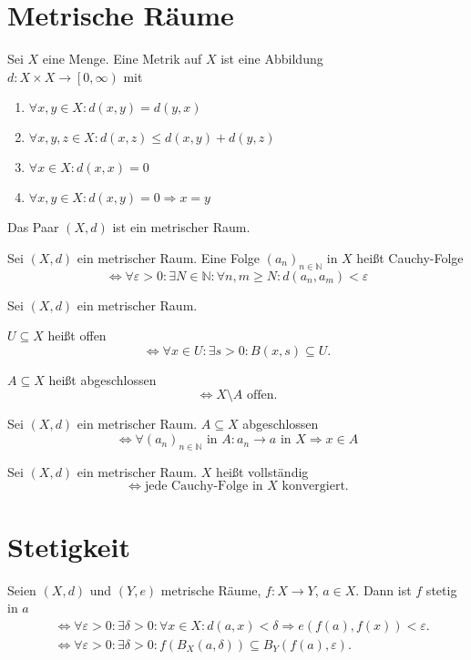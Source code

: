 \documentclass[]{scrartcl}
\newcommand{\N}{\ensuremath{\mathbb{N}}}
\begin{document}
\section*{Metrische R\"aume}
\begin{definition}
Sei $X$ eine Menge. Eine Metrik auf $X$ ist eine Abbildung\\$d\colon X\times X\to\left[0,\infty\right)$ mit
\begin{enumerate}
\item $\forall x,y\in X\colon d(x,y)=d(y,x)$
\item $\forall x,y,z\in X\colon d(x,z)\leq d(x,y)+d(y,z)$
\item $\forall x\in X\colon d(x,x)=0$
\item $\forall x,y\in X\colon d(x,y)=0\Rightarrow x=y$
\end{enumerate}
Das Paar $(X,d)$ ist ein metrischer Raum.
\end{definition}

\begin{definition}
Sei $(X,d)$ ein metrischer Raum. Eine Folge $(a_n)_{n\in\N}$ in $X$ hei\ss t Cauchy-Folge
\[\Leftrightarrow\forall\varepsilon>0\colon \exists N\in\N\colon \forall n,m\geq N\colon d(a_n,a_m)<\varepsilon\]
\end{definition}

\begin{definition}
Sei $(X,d)$ ein metrischer Raum.

$U\subseteq X$ hei\ss t offen
\[\Leftrightarrow\forall x\in U\colon \exists s>0\colon B(x,s)\subseteq U.\]

$A\subseteq X$ hei\ss t abgeschlossen \[\Leftrightarrow X\setminus A\text{ offen.}\]
\end{definition}

\begin{satz}
Sei $(X,d)$ ein metrischer Raum. $A\subseteq X$ abgeschlossen
\[\Leftrightarrow\forall (a_n)_{n\in\N}\text{ in }A\colon a_n\to a\text{ in }X\Rightarrow x\in A\]
\end{satz}

\begin{definition}
Sei $(X,d)$ ein metrischer Raum. $X$ hei\ss t vollst\"andig
\[\Leftrightarrow\text{jede Cauchy-Folge in $X$ konvergiert.}\]
\end{definition}

\section*{Stetigkeit}
\begin{definition}[Stetigkeit]
Seien $(X,d)$ und $(Y,e)$ metrische R\"aume, $f\colon X\to Y$, $a\in X$. Dann ist $f$ stetig in $a$
\begin{align*}
&\Leftrightarrow\forall\varepsilon>0\colon \exists\delta>0\colon \forall x\in X\colon d(a,x)<\delta\Rightarrow e(f(a),f(x))<\varepsilon.\\
&\Leftrightarrow\forall\varepsilon>0\colon \exists\delta>0\colon f(B_X(a,\delta))\subseteq B_Y(f(a),\varepsilon).
\end{align*}
\end{definition}
\end{document}
